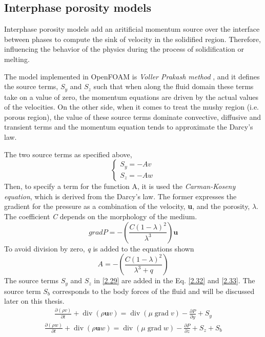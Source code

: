 \subsection{Interphase porosity models}

\setlength{\parindent}{0.5cm} Interphase porosity models add an aritificial momentum source over the interface between phases to compute the sink of velocity in the solidified region. Therefore, influencing the behavior of the physics during the process of solidification or melting.

\noindent The model implemented in OpenFOAM is \textit{Voller Prakash method} \cite{voller_prakash_1987}, and it defines the source terms, \textit{$S_y$} and \textit{$S_z$} such that when along the fluid domain these terms take on a value of zero, the momentum equations are driven by the actual values of the velocities. On the other side, when it comes to treat the mushy region (i.e. porous region), the value of these source terms dominate convective, diffusive and transient terms and the momentum equation tends to approximate the Darcy's law.

\noindent The two source terms as specified above,
\begin{equation}
	\left\{\begin{array}{l}
	S_{y}=-A v \\
	S_{z}=-A w
	\end{array}\right.
	\label{2.29}
\end{equation}
Then, to specify a term for the function A, it is used the \textit{Carman-Koseny equation}, which is derived from the Darcy's law. The former expresses the gradient for the pressure as a combination of the velocity, \textbf{u}, and the porosity, $\lambda$. The coefficient \textit{C} depends on the morphology of the medium.
\begin{equation}
	gradP=-\left(\frac{C(1-\lambda)^{2}}{\lambda^{3}}\right) \mathbf{u}
	\label{2.30}
\end{equation}
To avoid division by zero, \textit{q} is added to the equations shown 
\begin{equation}
	A=-\left(\frac{C(1-\lambda)^{2}}{\lambda^{3}+q}\right)
	\label{2.31}
\end{equation}
The source terms $S_{y}$ and $S_{z}$ in \ref{2.29} are added in the Eq. \ref{2.32} and \ref{2.33}. The source term $S_{b}$ corresponds to the body forces of the fluid and will be discussed later on this thesis.
\begin{equation}
	\begin{aligned}
		\frac{\partial(\rho v)}{\partial t}+\operatorname{div}(\rho \mathbf{u} v)=\operatorname{div}(\mu \operatorname{grad} v)-\frac{\partial P}{\partial y}+S_{y} 
	\end{aligned}
	\label{2.32}
\end{equation}
\begin{equation}
	\begin{aligned}
		\frac{\partial(\rho w)}{\partial t}+\operatorname{div}(\rho \mathbf{u} w)=\operatorname{div}(\mu \operatorname{grad} w)-\frac{\partial P}{\partial z}+S_{z}+S_{b}
	\end{aligned}
	\label{2.33}
\end{equation}

